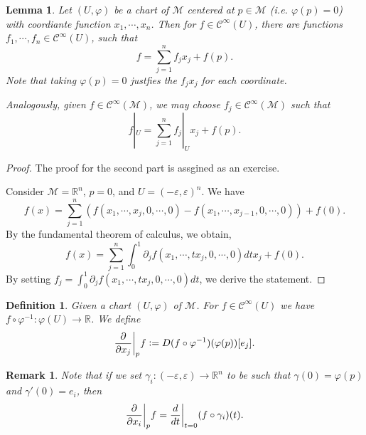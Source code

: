 \documentclass[10pt]{article}
\newtheorem{definition}{Definition}[section]
\newtheorem{lemma}{Lemma}[section]
\newtheorem{remark}{Remark}[section]
\newcommand{\defeq}{\vcentcolon=}
\newcommand{\R}[0]{\mathbb{R}}
\newcommand{\M}[0]{\mathcal{M}}
\newcommand{\cinf}[0]{\mathcal{C}^\infty}
\begin{document}
\begin{lemma}
Let $(U,\varphi)$ be a chart of $\M$ centered at $p\in\M$ (i.e. $\varphi(p) = 0$) with coordiante function $x_1,\cdots,x_n$. 
Then for $f\in\cinf(U)$, there are functions $f_1,\cdots, f_n\in\cinf(U)$, such that 
\begin{equation*}
f = \sum_{j=1}^n f_jx_j+f(p).
\end{equation*} 
Note that taking $\varphi(p)=0$ justfies the $f_jx_j$ for each coordinate.
\par Analogously, given $f\in\cinf(\M)$, we may choose $f_j\in\cinf(\M)$ such that 
\begin{equation*}
  f|_U = \sum_{j=1}^n f_j|_Ux_j +f(p).
\end{equation*}
\end{lemma}

\begin{proof}
  The proof for the second part is assgined as an exercise. 
  \par Consider $\M=\R^n$, $p=0$, and $U = (-\varepsilon,\varepsilon)^n$. We have 
  \begin{equation*}
    f(x) = \sum_{j=1}^n (f(x_1,\cdots,x_j,0,\cdots,0)-f(x_1,\cdots,x_{j-1},0,\cdots,0))+f(0).
  \end{equation*}
  By the fundamental theorem of calculus, we obtain, 
  \begin{equation*}
    f(x) = \sum_{j=1}^n \int_0^1 \partial_jf(x_1,\cdots,tx_j,0,\cdots,0)dtx_j+f(0).
  \end{equation*}
  By setting $f_j = \int_0^1 \partial_jf(x_1,\cdots,tx_j,0,\cdots,0)dt$, we derive the statement.
\end{proof}

\begin{definition}
  Given a chart $(U,\varphi)$ of $\M$. For $f\in\cinf(U)$ we have $f\circ\varphi^{-1}:\varphi(U)\to \R$. We define 
  \begin{equation*}
    {\frac \partial {\partial x_j}}\bigg{|}_pf \defeq  D(f\circ\varphi^{-1})(\varphi(p))[e_j].
  \end{equation*}
\end{definition}

\begin{remark}
  Note that if we set $\gamma_i:(-\varepsilon,\varepsilon)\to\R^n$ to be such that $\gamma(0) = \varphi(p)$ and $\gamma'(0) = e_i$, then 
  \begin{equation*}
    {\frac \partial {\partial x_i}}\bigg{|}_pf = {\frac {d} {dt}}\bigg{|}_{t=0}(f\circ\gamma_i)(t).
  \end{equation*}
\end{remark}
\end{document}
